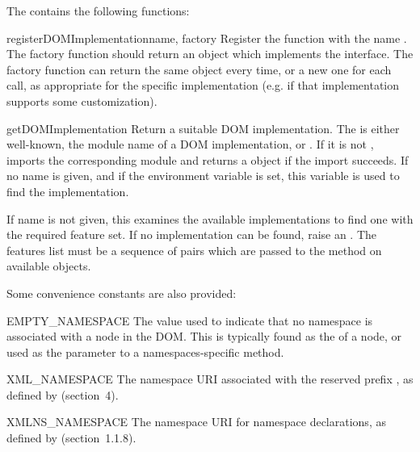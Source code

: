 The  contains the following functions:

\begin{funcdesc}{registerDOMImplementation}{name, factory}
Register the  function with the name .  The
factory function should return an object which implements the
 interface.  The factory function can return
the same object every time, or a new one for each call, as appropriate
for the specific implementation (e.g. if that implementation supports
some customization).
\end{funcdesc}

\begin{funcdesc}{getDOMImplementation}{}
Return a suitable DOM implementation. The  is either
well-known, the module name of a DOM implementation, or
. If it is not , imports the corresponding
module and returns a  object if the import
succeeds.  If no name is given, and if the environment variable
 is set, this variable is used to find the
implementation.

If name is not given, this examines the available implementations to
find one with the required feature set.  If no implementation can be
found, raise an .  The features list must be a
sequence of  pairs which are
passed to the  method on available
 objects.
\end{funcdesc}


Some convenience constants are also provided:

\begin{datadesc}{EMPTY_NAMESPACE}
  The value used to indicate that no namespace is associated with a
  node in the DOM.  This is typically found as the
   of a node, or used as the 
  parameter to a namespaces-specific method.
\end{datadesc}

\begin{datadesc}{XML_NAMESPACE}
  The namespace URI associated with the reserved prefix , as
  defined by
  (section~4).
\end{datadesc}

\begin{datadesc}{XMLNS_NAMESPACE}
  The namespace URI for namespace declarations, as defined by
   (section~1.1.8).
\end{datadesc}


